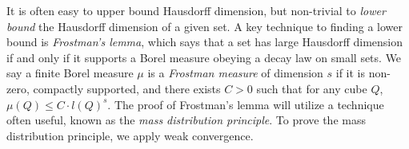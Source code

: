 
It is often easy to upper bound Hausdorff dimension, but non-trivial to \emph{lower bound} the Hausdorff dimension of a given set. A key technique to finding a lower bound is \emph{Frostman's lemma}, which says that a set has large Hausdorff dimension if and only if it supports a Borel measure obeying a decay law on small sets. We say a finite Borel measure $\mu$ is a \emph{Frostman measure} of dimension $s$ if it is non-zero, compactly supported, and there exists $C > 0$ such that for any cube $Q$, $\mu(Q) \leq C \cdot l(Q)^s$. The proof of Frostman's lemma will utilize a technique often useful, known as the \emph{mass distribution principle}. To prove the mass distribution principle, we apply weak convergence.

